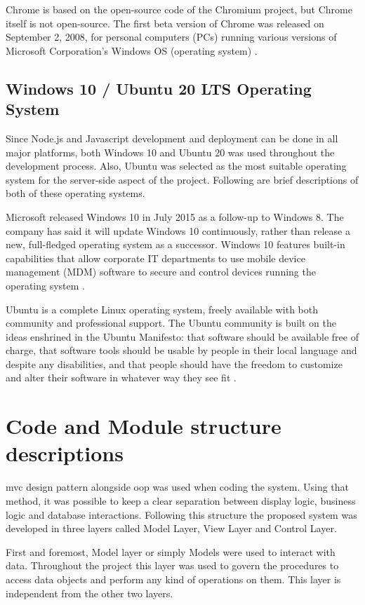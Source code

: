 \documentclass[12pt]{report}
\begin{document}
Chrome is based on the open-source code of the Chromium project, but Chrome itself is not open-source. The first beta version of Chrome was released on September 2, 2008, for personal computers (PCs) running various versions of Microsoft Corporation's Windows OS (operating system) \cite{hosch_2020_chrome}.

\subsection{Windows 10 / Ubuntu 20 LTS Operating System}
Since Node.js and Javascript development and deployment can be done in all major platforms, both Windows 10 and Ubuntu 20 was used throughout the development process. Also, Ubuntu was selected as the most suitable operating system for the server-side aspect of the project. Following are brief descriptions of both of these operating systems.

Microsoft released Windows 10 in July 2015 as a follow-up to Windows 8. The company has said it will update Windows 10 continuously, rather than release a new, full-fledged operating system as a successor. Windows 10 features built-in capabilities that allow corporate IT departments to use mobile device management (MDM) software to secure and control devices running the operating system \cite{margaretrouse_2017_what}.

Ubuntu is a complete Linux operating system, freely available with both community and professional support. The Ubuntu community is built on the ideas enshrined in the Ubuntu Manifesto: that software should be available free of charge, that software tools should be usable by people in their local language and despite any disabilities, and that people should have the freedom to customize and alter their software in whatever way they see fit \cite{_2019_what}.


\section{Code and Module structure descriptions}
\acrshort{mvc} design pattern alongside \acrshort{oop} was used when coding the system. Using that method, it was possible to keep a clear separation between display logic, business logic and database interactions. Following this structure the proposed system was developed in three layers called Model Layer, View Layer and Control Layer.

First and foremost, Model layer or simply Models were used to interact with data. Throughout the project this layer was used to govern the procedures to access data objects and perform any kind of operations on them. This layer is independent from the other two layers.
\end{document}
